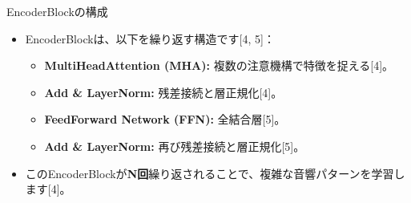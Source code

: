 \documentclass[unicode,12pt,aspectratio=169,dvipdfmx]{beamer}
\begin{document}

\begin{frame}{EncoderBlockの構成} %
    \begin{itemize}
        \item EncoderBlockは、以下を繰り返す構造です[4, 5]：
        \begin{itemize}
            \item \textbf{MultiHeadAttention (MHA):} 複数の注意機構で特徴を捉える[4]。
            \item \textbf{Add \& LayerNorm:} 残差接続と層正規化[4]。
            \item \textbf{FeedForward Network (FFN):} 全結合層[5]。
            \item \textbf{Add \& LayerNorm:} 再び残差接続と層正規化[5]。
        \end{itemize}
        \item このEncoderBlockが\textbf{N回}繰り返されることで、複雑な音響パターンを学習します[4]。
    \end{itemize}
\end{frame}
\end{document}
